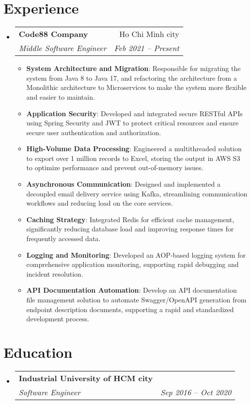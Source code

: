 \documentclass[letterpaper,10pt]{article}
\makeatletter
\newcommand{\resumeItem}[2]{
    \item\small{
        \textbf{#1}{: #2 \vspace{2pt}}
    }
}
\newcommand{\resumeSubheading}[4]{
  \vspace{-1pt}\item
    \begin{tabular*}{0.97\textwidth}[t]{l@{\extracolsep{\fill}}r}
      \vspace{5pt}
      \textbf{#1} & #2 \\
      \vspace{5pt}
      \textit{\small#3} & \textit{\small #4} \\
    \end{tabular*}\vspace{-5pt}
}
\newcommand{\resumeSubHeadingListStart}{\begin{itemize}[leftmargin=*]}
\newcommand{\resumeSubHeadingListEnd}{\end{itemize}}
\newcommand{\resumeItemListStart}{\begin{itemize}[leftmargin=*, itemsep=6pt]}
\newcommand{\resumeItemListEnd}{\end{itemize}\vspace{-5pt}}
\makeatother
\begin{document}
\section{Experience}\vspace{-4pt}
    \resumeSubHeadingListStart
        \resumeSubheading
            {Code88 Company}{Ho Chi Minh city}
            {Middle Software Engineer}{Feb 2021 -- Present}
        \resumeItemListStart
            \resumeItem{System Architecture and Migration}
                {Responsible for migrating the system from Java 8 to Java 17, and refactoring the architecture from a Monolithic architecture to Microservices to make the system more flexible and easier to maintain.}
            \resumeItem{Application Security}
                {Developed and integrated secure RESTful APIs using Spring Security and JWT to protect critical resources and ensure secure user authentication and authorization.}
            \resumeItem{High-Volume Data Processing}
                {Engineered a multithreaded solution to export over 1 million records to Excel, storing the output in AWS S3 to optimize performance and prevent out-of-memory issues.}
            \resumeItem{Asynchronous Communication}
                {Designed and implemented a decoupled email delivery service using Kafka, streamlining communication workflows and reducing load on the core services.}
            \resumeItem{Caching Strategy}
                {Integrated Redis for efficient cache management, significantly reducing database load and improving response times for frequently accessed data.}
            \resumeItem{Logging and Monitoring}
                {Developed an AOP-based logging system for comprehensive application monitoring, supporting rapid debugging and incident resolution.}
            \resumeItem{API Documentation Automation}
                {Develop an API documentation file management solution to automate Swagger/OpenAPI generation from endpoint description documents, supporting a rapid and standardized development process.}
        \resumeItemListEnd
    \resumeSubHeadingListEnd


\section{Education}\vspace{-4pt}
    \resumeSubHeadingListStart
        \resumeSubheading
            {Industrial University of HCM city}{}
            {Software Engineer}{Sep 2016 -- Oct 2020}
    \resumeSubHeadingListEnd


\end{document}
